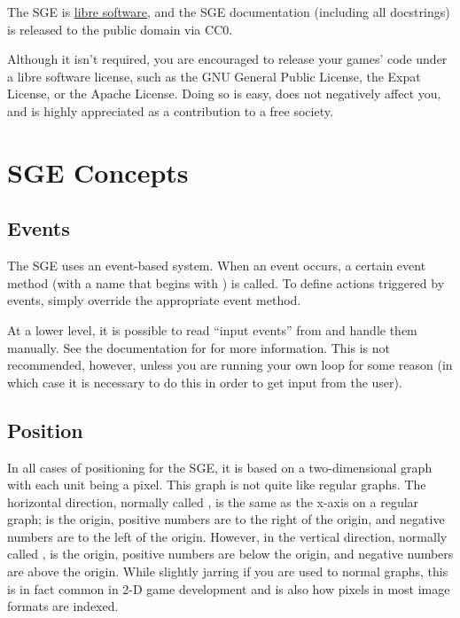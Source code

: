 \documentclass[letterpaper,10pt,english]{sphinxmanual}
\begin{document}
The SGE is \href{http://gnu.org/philosophy/free-sw.html}{libre software},
and the SGE documentation (including all docstrings) is released to the
public domain via CC0.

Although it isn't required, you are encouraged to release your games'
code under a libre software license, such as the GNU General Public
License, the Expat License, or the Apache License.  Doing so is easy,
does not negatively affect you, and is highly appreciated as a
contribution to a free society.


\section{SGE Concepts}
\label{sge:sge-concepts}

\subsection{Events}
\label{sge:events}
The SGE uses an event-based system.  When an event occurs, a certain
event method (with a name that begins with ) is called. To
define actions triggered by events, simply override the appropriate
event method.

At a lower level, it is possible to read ``input events'' from
 and handle them manually.  See the
documentation for {\hyperref[input:module\string-sge.input]{\emph{}}} for more information.  This is not
recommended, however, unless you are running your own loop for some
reason (in which case it is necessary to do this in order to get input
from the user).


\subsection{Position}
\label{sge:position}
In all cases of positioning for the SGE, it is based on a
two-dimensional graph with each unit being a pixel.  This graph is not
quite like regular graphs.  The horizontal direction, normally called
, is the same as the x-axis on a regular graph;  is the
origin, positive numbers are to the right of the origin, and negative
numbers are to the left of the origin.  However, in the vertical
direction, normally called ,  is the origin, positive numbers
are below the origin, and negative numbers are above the origin.  While
slightly jarring if you are used to normal graphs, this is in fact
common in 2-D game development and is also how pixels in most image
formats are indexed.
\end{document}

